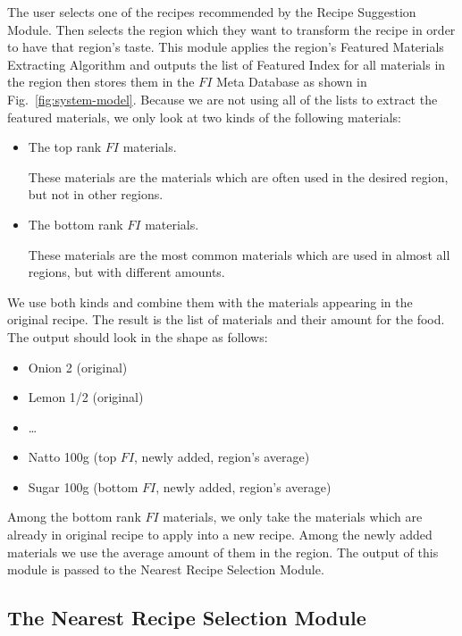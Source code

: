 The user selects one of the recipes recommended by the Recipe Suggestion Module. Then selects the region which they want to transform the recipe in order to have that region's taste. This module applies the region's Featured Materials Extracting Algorithm and outputs the list of Featured Index for all materials in the region then stores them in the $FI$ Meta Database as shown in Fig.~\ref{fig:system-model}. Because we are not using all of the lists to extract the featured materials, we only look at two kinds of the following materials: 

\begin{itemize}
\item The top rank $FI$ materials.

These materials are the materials which are often used in the desired region, but not in other regions. 
\item The bottom rank $FI$ materials.

These materials are the most common materials which are used in almost all regions, but with different amounts. 
	 
\end{itemize}

We use both kinds and combine them with the materials appearing in the original recipe. The result is the list of materials and their amount for the food. The output should look in the shape as follows:

\begin{itemize}
\item Onion 2     (original)
\item Lemon 1/2   (original)
\item \ldots
\item Natto 100g  (top $FI$, newly added, region's average)
\item Sugar 100g  (bottom $FI$, newly added, region's average)
\end{itemize}

Among the bottom rank $FI$ materials, we only take the materials which are already in original recipe to apply into a new recipe. Among the newly added materials we use the average amount of them in the region. The output of this module is passed to the Nearest Recipe Selection Module. 
 
\subsection{The Nearest Recipe Selection Module} 

